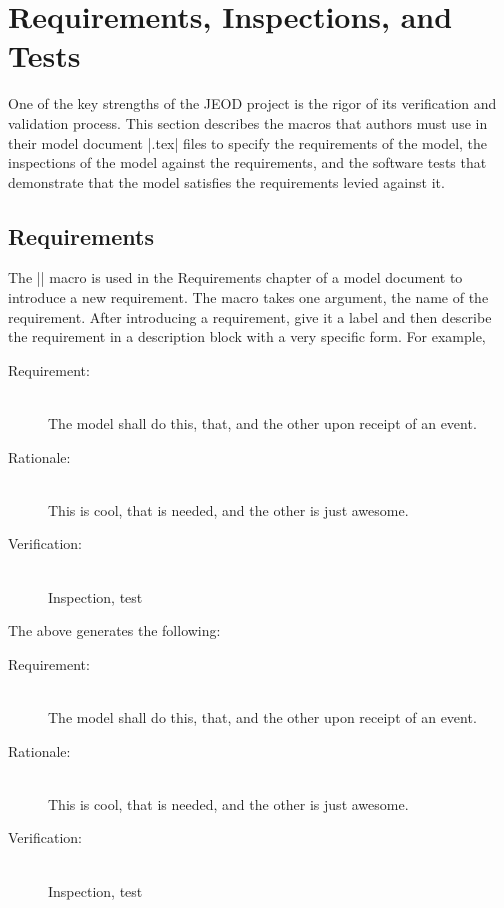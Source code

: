 \section{Requirements, Inspections, and Tests}
\label{sec:reqt_insp_test}
One of the key strengths of the JEOD project is the rigor of its
verification and validation process.
This section describes the macros that authors must use in their
model document |.tex| files to specify the requirements of the model,
the inspections of the model against the requirements, and the
software tests that demonstrate that the model satisfies the requirements
levied against it.

\subsection{Requirements}\label{sec:reqt}
The |\requirement| macro is used in the Requirements chapter of a model document
to introduce a new requirement. The macro takes one argument, the name of the
requirement. After introducing a requirement, give it a label and then describe
the requirement in a description block with a very specific form.
For example,
\begin{codeblock}
\label{reqt:unique_label}
\begin{description}
\item[Requirement:]\ \\
  The model shall do this, that, and the other upon receipt of an event.
\item[Rationale:]\ \\
  This is cool, that is needed, and the other is just awesome.
\item[Verification:]\ \\
  Inspection, test
\end{description}
\end{codeblock}
The above generates the following:
\def\ModelPrefix{Example}
\label{reqt:unique_label}
\begin{description}
\item[Requirement:]\ \\
  The model shall do this, that, and the other upon receipt of an event.
\item[Rationale:]\ \\
  This is cool, that is needed, and the other is just awesome.
\item[Verification:]\ \\
  Inspection, test
\end{description}

